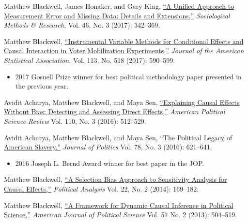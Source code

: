 \documentclass[11pt,article,oneside]{memoir}
\begin{document}
\begin{etaremune}[leftmargin=0.2in, topsep = 0in, partopsep=0in, itemsep=1em]
\item Matthew Blackwell, James Honaker, and Gary King, \href{http://gking.harvard.edu/files/measured.pdf}{``A Unified Approach to Measurement Error and
    Missing Data: Details and Extensions,''} \emph{Sociological Methods \& Research}, Vol. 46, No. 3 (2017): 342--369.
  
\item Matthew Blackwell, \href{http://www.mattblackwell.org/files/papers/joint-iv.pdf}{``Instrumental Variable Methods for Conditional Effects and Causal Interaction in Voter Mobilization Experiments,''} \emph{Journal of the American Statistical Association}, Vol. 113, No. 518 (2017): 590--599. 
\begin{itemize}[topsep=0em]
\item  2017 Gosnell Prize winner for best political methodology paper presented in the previous year. %
\end{itemize}

\item Avidit Acharya, Matthew Blackwell, and Maya Sen, \href{http://www.mattblackwell.org/files/papers/direct-effects.pdf}{``Explaining Causal Effects Without Bias: Detecting and Assessing Direct Effects,''} \emph{American Political Science Review } Vol. 110, No. 3 (2016): 512--529.

  
\item Avidit Acharya, Matthew Blackwell, and Maya Sen, \href{http://www.mattblackwell.org/files/papers/slavery.pdf}{``The Political Legacy of American Slavery,''}   \emph{Journal of Politics }Vol. 78, No. 3 (2016): 621--641.
\begin{itemize}[topsep=0em]
\item 2016 Joseph L. Bernd Award winner for best paper in the JOP.
\end{itemize}

\item Matthew Blackwell, \href{http://gking.harvard.edu/files/sens.pdf}{``A Selection Bias Approach to Sensitivity
    Analysis for Causal Effects,''} \emph{Political Analysis} Vol. 22, No. 2 (2014): 169--182.
  
\item Matthew Blackwell,
\href{http://mattblackwell.org/files/papers/dynci.pdf}{``A Framework
  for Dynamic Causal Inference in Political Science,''}
\emph{American Journal of Political Science} Vol. 57 No. 2 (2013): 504--519.


\end{etaremune}
\end{document}
